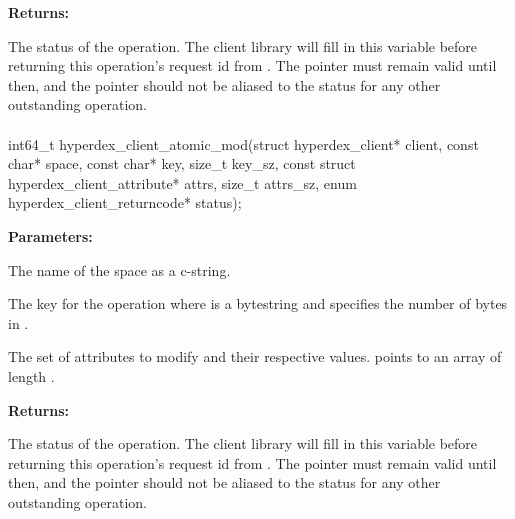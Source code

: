 \noindent\textbf{Returns:}
\begin{description}[labelindent=\widthof{{\code{status}}},leftmargin=*,noitemsep,nolistsep,align=right]
\item[\code{status}] The status of the operation.  The client library will fill in this variable before returning this operation's request id from .  The pointer must remain valid until then, and the pointer should not be aliased to the status for any other outstanding operation.
\end{description}

\paragraph{}
\begin{ccode}
int64_t hyperdex_client_atomic_mod(struct hyperdex_client* client,
                const char* space,
                const char* key, size_t key_sz,
                const struct hyperdex_client_attribute* attrs, size_t attrs_sz,
                enum hyperdex_client_returncode* status);
\end{ccode}
\funcdesc 

\noindent\textbf{Parameters:}
\begin{description}[labelindent=\widthof{{\code{attrs}, \code{attrs\_sz}}},leftmargin=*,noitemsep,nolistsep,align=right]
\item[\code{space}] The name of the space as a c-string.
\item[\code{key}, \code{key\_sz}] The key for the operation where  is a bytestring and  specifies the number of bytes in .
\item[\code{attrs}, \code{attrs\_sz}] The set of attributes to modify and their respective values.   points to an array of length .
\end{description}

\noindent\textbf{Returns:}
\begin{description}[labelindent=\widthof{{\code{status}}},leftmargin=*,noitemsep,nolistsep,align=right]
\item[\code{status}] The status of the operation.  The client library will fill in this variable before returning this operation's request id from .  The pointer must remain valid until then, and the pointer should not be aliased to the status for any other outstanding operation.
\end{description}

